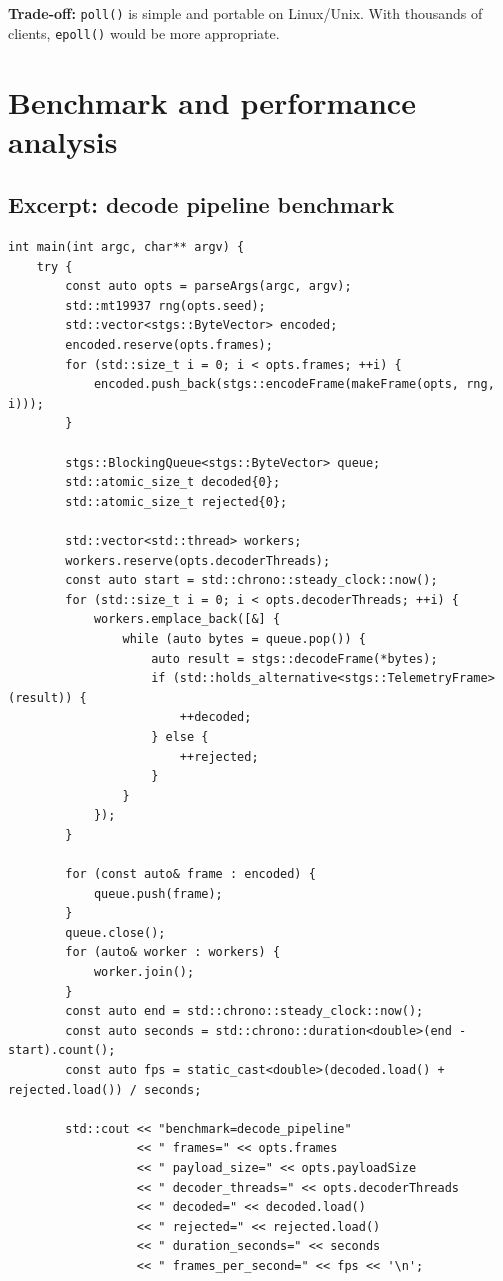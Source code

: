 \documentclass[10pt,a4paper]{article}
\newcommand{\tradeoff}[1]{\textbf{Trade-off:} #1}
\begin{document}
\tradeoff{\texttt{poll()} is simple and portable on Linux/Unix. With thousands of clients, \texttt{epoll()} would be more appropriate.}

\section{Benchmark and performance analysis}

\subsection{Excerpt: decode pipeline benchmark}
\begin{lstlisting}[caption={Decode pipeline benchmark}]
int main(int argc, char** argv) {
    try {
        const auto opts = parseArgs(argc, argv);
        std::mt19937 rng(opts.seed);
        std::vector<stgs::ByteVector> encoded;
        encoded.reserve(opts.frames);
        for (std::size_t i = 0; i < opts.frames; ++i) {
            encoded.push_back(stgs::encodeFrame(makeFrame(opts, rng, i)));
        }

        stgs::BlockingQueue<stgs::ByteVector> queue;
        std::atomic_size_t decoded{0};
        std::atomic_size_t rejected{0};

        std::vector<std::thread> workers;
        workers.reserve(opts.decoderThreads);
        const auto start = std::chrono::steady_clock::now();
        for (std::size_t i = 0; i < opts.decoderThreads; ++i) {
            workers.emplace_back([&] {
                while (auto bytes = queue.pop()) {
                    auto result = stgs::decodeFrame(*bytes);
                    if (std::holds_alternative<stgs::TelemetryFrame>(result)) {
                        ++decoded;
                    } else {
                        ++rejected;
                    }
                }
            });
        }

        for (const auto& frame : encoded) {
            queue.push(frame);
        }
        queue.close();
        for (auto& worker : workers) {
            worker.join();
        }
        const auto end = std::chrono::steady_clock::now();
        const auto seconds = std::chrono::duration<double>(end - start).count();
        const auto fps = static_cast<double>(decoded.load() + rejected.load()) / seconds;

        std::cout << "benchmark=decode_pipeline"
                  << " frames=" << opts.frames
                  << " payload_size=" << opts.payloadSize
                  << " decoder_threads=" << opts.decoderThreads
                  << " decoded=" << decoded.load()
                  << " rejected=" << rejected.load()
                  << " duration_seconds=" << seconds
                  << " frames_per_second=" << fps << '\n';

\end{lstlisting}
\end{document}
